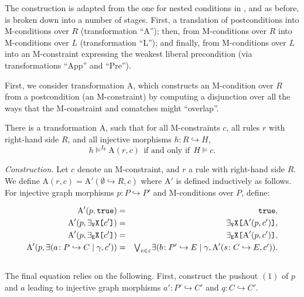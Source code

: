 \documentclass{llncs}
\newcommand{\mt}[1]{\text{\tt{#1}}}
\begin{document}
The construction is adapted from the one for nested conditions in \cite{Habel-Pennemann09a}, and as before, is broken down into a number of stages. First, a translation of postconditions into M-conditions over $R$ (transformation ``A''); then, from M-conditions over $R$ into M-conditions over $L$ (transformation ``L''); and finally, from M-conditions over $L$ into an M-constraint expressing the weakest liberal precondition (via transformations ``App'' and ``Pre'').

First, we consider transformation A, which constructs an M-condition over $R$ from a postcondition (an M-constraint) by computing a disjunction over all the ways that the M-constraint and comatches might ``overlap''.

\begin{theorem}\label{thm:A}\rm
	There is a transformation A, such that for all M-constraints $c$, all rules $r$ with right-hand side $R$, and all injective morphisms $h\!: R\hookrightarrow H$,
	\[ h \models^{I_\emptyset} \text{A}(r,c)\ \ \text{if and only if}\ \ H \models c. \]
\end{theorem}

\noindent	\emph{Construction.} Let $c$ denote an M-constraint, and $r$ a rule with right-hand side $R$. We define $\text{A}(r,c) = \text{A}'(\emptyset\hookrightarrow R,c)$ where $\text{A}'$ is defined inductively as follows. For injective graph morphisms $p\!: P\hookrightarrow P'$ and M-conditions over $P$, define:


	\begin{eqnarray*}
	\text{A}'(p,\mathtt{true}) &=& \mathtt{true}, \\
	\text{A}'(p,\exists_\mathtt{V}\mathtt{X}\mt{[}c'\mt{]}) &=& \exists_\mathtt{V}\mathtt{X}\mt{[}\text{A}'(p,c')\mt{]}, \\
	\text{A}'(p,\exists_\mathtt{E}\mathtt{X}\mt{[}c'\mt{]}) &=& \exists_\mathtt{E}\mathtt{X}\mt{[}\text{A}'(p,c')\mt{]}, \\
	\text{A}'(p,\exists(a\!:P\hookrightarrow C\mid\gamma,c')) &=& \textstyle{\bigvee}_{e \in \varepsilon} \exists (b\!:P'\hookrightarrow E \mid\gamma, \text{A}'(s\!:C\hookrightarrow E,c')).
	\end{eqnarray*}\\


	

	\noindent	The final equation relies on the following. First, construct the pushout $(1)$ of $p$ and $a$ leading to injective graph morphisms $a'\!: P' \hookrightarrow C'$ and $q\!: C \hookrightarrow C'$.
\end{document}
